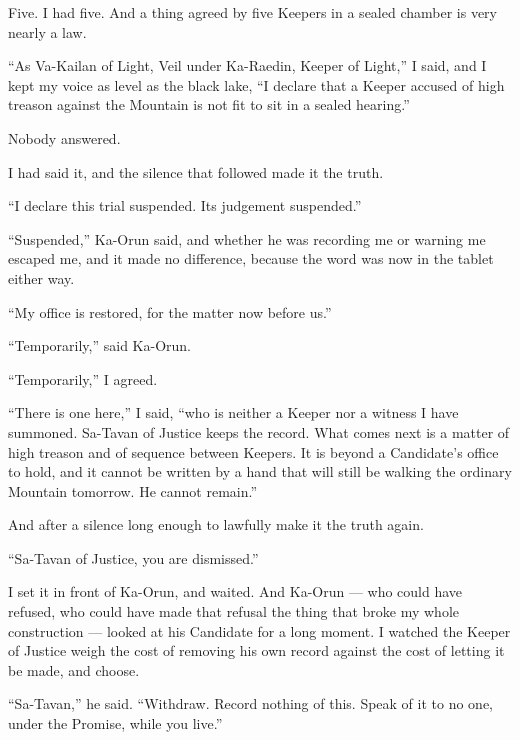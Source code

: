 Five. I had five. And a thing agreed by five Keepers in a sealed chamber is very nearly a law.\par
 
``As Va-Kailan of Light, Veil under Ka-Raedin, Keeper of Light,'' I said, and I kept my voice as level as the black lake, ``I declare that a Keeper accused of high treason against the Mountain is not fit to sit in a sealed hearing.''\par
 
Nobody answered.\par
 
I had said it, and the silence that followed made it the truth. \par
 
``I declare this trial suspended. Its judgement suspended.''\par
 
``Suspended,'' Ka-Orun said, and whether he was recording me or warning me escaped me, and it made no difference, because the word was now in the tablet either way.\par
 
``My office is restored, for the matter now before us.''\par
 
``Temporarily,'' said Ka-Orun.\par
 
``Temporarily,'' I agreed.

``There is one here,'' I said, ``who is neither a Keeper nor a witness I have summoned. Sa-Tavan of Justice keeps the record. What comes next is a matter of high treason and of sequence between Keepers. It is beyond a Candidate's office to hold, and it cannot be written by a hand that will still be walking the ordinary Mountain tomorrow. He cannot remain.''\par

And after a silence long enough to lawfully make it the truth again.

``Sa-Tavan of Justice, you are dismissed.''

I set it in front of Ka-Orun, and waited. And Ka-Orun --- who could have refused, who could have made that refusal the thing that broke my whole construction --- looked at his Candidate for a long moment. 
I watched the Keeper of Justice weigh the cost of removing his own record against the cost of letting it be made, and choose.\par
 
``Sa-Tavan,'' he said. ``Withdraw. Record nothing of this. Speak of it to no one, under the Promise, while you live.''\par
 

